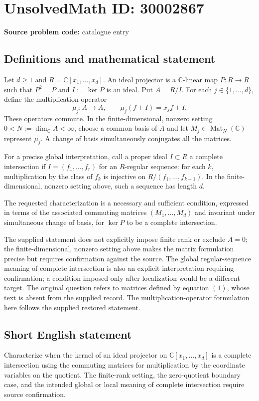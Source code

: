 \documentclass[11pt]{article}
\newcommand{\C}{\mathbb{C}}
\begin{document}
\section*{UnsolvedMath ID: 30002867}
\textbf{Source problem code:} catalogue entry
\subsection{Definitions and mathematical statement}
Let \(d\geq 1\) and \(R=\C[x_1,\ldots,x_d]\). An ideal projector is a \(\C\)-linear map \(P:R\to R\) such that \(P^2=P\) and \(I:=\ker P\) is an ideal. Put \(A=R/I\). For each \(j\in\{1,\ldots,d\}\), define the multiplication operator
\[
\mu_j:A\longrightarrow A,\qquad \mu_j(f+I)=x_jf+I.
\]
These operators commute. In the finite-dimensional, nonzero setting \(0<N:=\dim_{\C}A<\infty\), choose a common basis of \(A\) and let \(M_j\in\operatorname{Mat}_N(\C)\) represent \(\mu_j\). A change of basis simultaneously conjugates all the matrices.

For a precise global interpretation, call a proper ideal \(I\subset R\) a complete intersection if \(I=(f_1,\ldots,f_r)\) for an \(R\)-regular sequence: for each \(k\), multiplication by the class of \(f_k\) is injective on \(R/(f_1,\ldots,f_{k-1})\). In the finite-dimensional, nonzero setting above, such a sequence has length \(d\).

The requested characterization is a necessary and sufficient condition, expressed in terms of the associated commuting matrices \((M_1,\ldots,M_d)\) and invariant under simultaneous change of basis, for \(\ker P\) to be a complete intersection.

The supplied statement does not explicitly impose finite rank or exclude \(A=0\); the finite-dimensional, nonzero setting above makes the matrix formulation precise but requires confirmation against the source. The global regular-sequence meaning of complete intersection is also an explicit interpretation requiring confirmation; a condition imposed only after localization would be a different target. The original question refers to matrices defined by equation \((1)\), whose text is absent from the supplied record. The multiplication-operator formulation here follows the supplied restored statement.
\subsection{Short English statement}
Characterize when the kernel of an ideal projector on \(\C[x_1,\ldots,x_d]\) is a complete intersection using the commuting matrices for multiplication by the coordinate variables on the quotient. The finite-rank setting, the zero-quotient boundary case, and the intended global or local meaning of complete intersection require source confirmation.
\end{document}
